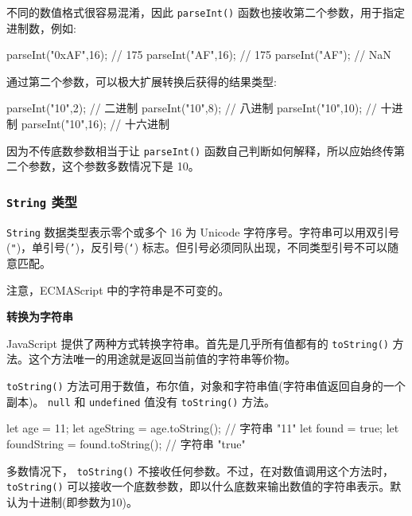 不同的数值格式很容易混淆，因此 \texttt{parseInt()} 函数也接收第二个参数，用于指定进制数，例如:

\begin{JavaScript}
parseInt("0xAF",16);    // 175
parseInt("AF",16);      // 175
parseInt("AF");         // NaN
\end{JavaScript}

通过第二个参数，可以极大扩展转换后获得的结果类型:

\begin{JavaScript}
parseInt("10",2);       // 二进制
parseInt("10",8);       // 八进制
parseInt("10",10);      // 十进制
parseInt("10",16);      // 十六进制
\end{JavaScript}

因为不传底数参数相当于让 \texttt{parseInt()} 函数自己判断如何解释，所以应始终传第二个参数，这个参数多数情况下是 10。


\subsubsection{\texttt{String} 类型}

\texttt{String} 数据类型表示零个或多个 16 为 Unicode 字符序号。字符串可以用双引号(\texttt{"})，单引号(\texttt{'})，反引号(\texttt{`}) 标志。但引号必须同队出现，不同类型引号不可以随意匹配。

注意，ECMAScript 中的字符串是不可变的。

\noindent\textbf{转换为字符串}

JavaScript 提供了两种方式转换字符串。首先是几乎所有值都有的 \texttt{toString()} 方法。这个方法唯一的用途就是返回当前值的字符串等价物。

\texttt{toString()} 方法可用于数值，布尔值，对象和字符串值(字符串值返回自身的一个副本)。 \texttt{null} 和 \texttt{undefined} 值没有 \texttt{toString()} 方法。

\begin{JavaScript}
let age = 11;
let ageString = age.toString();         // 字符串 "11"
let found = true;
let foundString = found.toString();     // 字符串 "true"
\end{JavaScript}

多数情况下， \texttt{toString()} 不接收任何参数。不过，在对数值调用这个方法时，\texttt{toString()} 可以接收一个底数参数，即以什么底数来输出数值的字符串表示。默认为十进制(即参数为10)。

